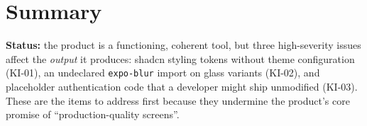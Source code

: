 \section{Summary}

\textbf{Status:} the product is a functioning, coherent tool, but three
high-severity issues affect the \emph{output} it produces: shadcn styling tokens
without theme configuration (KI-01), an undeclared \texttt{expo-blur} import on
glass variants (KI-02), and placeholder authentication code that a developer
might ship unmodified (KI-03). These are the items to address first because they
undermine the product's core promise of ``production-quality screens''.
